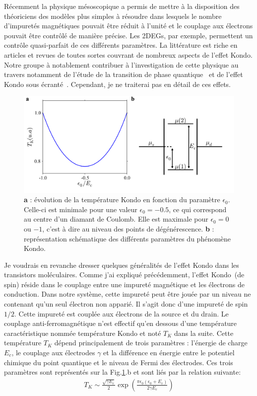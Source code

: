 Récemment la physique mésoscopique a permis de mettre à la disposition des théoriciens des modèles plus simples à résoudre dans lesquels le nombre d'impuretés magnétiques pouvait être réduit à l'unité et le couplage aux électrons pouvait être contrôlé de manière précise. Les 2DEGs, par exemple, permettent un contrôle quasi-parfait de ces différents paramètres. La littérature est riche en articles et revues de toutes sortes couvrant de nombreux aspects de l'effet Kondo. Notre groupe à notablement contribuer à l'investigation de cette physique au travers notamment de l'étude de la transition de phase quantique~\cite{Roch2008} et de l'effet Kondo sous écranté~\cite{Roch2009}. Cependant, je ne traiterai pas en détail de ces effets.

\begin{figure}
\includegraphics[scale=0.45]{Annexe2/figure6/figure6.pdf} 
\caption{\textbf{a} : évolution de la température Kondo en fonction du paramètre $\epsilon_0$. Celle-ci est minimale pour une valeur $\epsilon_0=-0.5$, ce qui correspond au centre d'un diamant de Coulomb. Elle est maximale pour $\epsilon_0=0$ ou $-1$, c'est à dire au niveau des points de dégénérescence. \textbf{b} : représentation schématique des différents paramètres du phénomène Kondo.}
\label{Kondo_param}
\end{figure}


Je voudrais en revanche dresser quelques généralités de l'effet Kondo dans les transistors moléculaires. Comme j'ai expliqué précédemment, l'effet Kondo~(de spin) réside dans le couplage entre une impureté magnétique et les électrons de conduction. Dans notre système, cette impureté peut être jouée par un niveau ne contenant qu'un seul électron non apparié. Il s'agit donc d'une impureté de spin $1/2$. Cette impureté est couplée aux électrons de la source et du drain. Le couplage anti-ferromagnétique n'est effectif qu'en dessous d'une température caractéristique nommée température Kondo et noté $T_K$ dans la suite. Cette température $T_K$ dépend principalement de trois paramètres : l'énergie de charge $E_c$, le couplage aux électrodes $\gamma$ et la différence en énergie entre le potentiel chimique du point quantique et le niveau de Fermi des électrodes. Ces trois paramètres sont représentés sur la Fig.\ref{Kondo_param}.b et sont liés par la relation suivante:
\begin{eqnarray}
T_K \sim \frac{\sqrt{\gamma E_c}}{2} \exp(\frac{\pi \epsilon_0(\epsilon_0 + E_c)}{2\gamma E_c})
\end{eqnarray}

